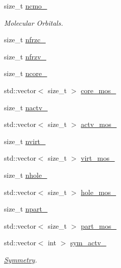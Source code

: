 \begin{DoxyCompactItemize}
size\+\_\+t \mbox{\hyperlink{classforte_1_1_m_c_s_r_g_p_t2___m_o_a622132d781e2204d32c7c71a2ff38c50}{ncmo\+\_\+}}
\begin{DoxyCompactList}\small\item\em Molecular Orbitals. \end{DoxyCompactList}\item 
size\+\_\+t \mbox{\hyperlink{classforte_1_1_m_c_s_r_g_p_t2___m_o_adcfce8d353b5e7570cc39f4ca2fa4faa}{nfrzc\+\_\+}}
\item 
size\+\_\+t \mbox{\hyperlink{classforte_1_1_m_c_s_r_g_p_t2___m_o_adeed1d99a9fc941ac2e12b8c973662b6}{nfrzv\+\_\+}}
\item 
size\+\_\+t \mbox{\hyperlink{classforte_1_1_m_c_s_r_g_p_t2___m_o_a14d8e1325d662fba9349f407e2914545}{ncore\+\_\+}}
\item 
std\+::vector$<$ size\+\_\+t $>$ \mbox{\hyperlink{classforte_1_1_m_c_s_r_g_p_t2___m_o_a9c89f12d524c3f1b767115f4bc1a20b8}{core\+\_\+mos\+\_\+}}
\item 
size\+\_\+t \mbox{\hyperlink{classforte_1_1_m_c_s_r_g_p_t2___m_o_a20a862b80242d33cb0ea5f754c39b13c}{nactv\+\_\+}}
\item 
std\+::vector$<$ size\+\_\+t $>$ \mbox{\hyperlink{classforte_1_1_m_c_s_r_g_p_t2___m_o_a9bccae7e40de9bd8aa67843dcfd0d66b}{actv\+\_\+mos\+\_\+}}
\item 
size\+\_\+t \mbox{\hyperlink{classforte_1_1_m_c_s_r_g_p_t2___m_o_a136aec4dfbb582a38ea5cd97cbc78dc3}{nvirt\+\_\+}}
\item 
std\+::vector$<$ size\+\_\+t $>$ \mbox{\hyperlink{classforte_1_1_m_c_s_r_g_p_t2___m_o_a73605df231cff451462141dc30f3180e}{virt\+\_\+mos\+\_\+}}
\item 
size\+\_\+t \mbox{\hyperlink{classforte_1_1_m_c_s_r_g_p_t2___m_o_a1b683b2c5bc8cdc4facc5b74b399d699}{nhole\+\_\+}}
\item 
std\+::vector$<$ size\+\_\+t $>$ \mbox{\hyperlink{classforte_1_1_m_c_s_r_g_p_t2___m_o_a0a928e046fd3a6d08e28fbbb5d8260fa}{hole\+\_\+mos\+\_\+}}
\item 
size\+\_\+t \mbox{\hyperlink{classforte_1_1_m_c_s_r_g_p_t2___m_o_a789bd33d16142dcbdee59fca2f45358a}{npart\+\_\+}}
\item 
std\+::vector$<$ size\+\_\+t $>$ \mbox{\hyperlink{classforte_1_1_m_c_s_r_g_p_t2___m_o_ab60fcc4eb184666fbd626831b2552d12}{part\+\_\+mos\+\_\+}}
\item 
std\+::vector$<$ int $>$ \mbox{\hyperlink{classforte_1_1_m_c_s_r_g_p_t2___m_o_a9eba1f5e4fa8e9e096c87d86f7ad1f90}{sym\+\_\+actv\+\_\+}}
\begin{DoxyCompactList}\small\item\em \mbox{\hyperlink{classforte_1_1_symmetry}{Symmetry}}. \end{DoxyCompactList}\item 

\end{DoxyCompactItemize}
